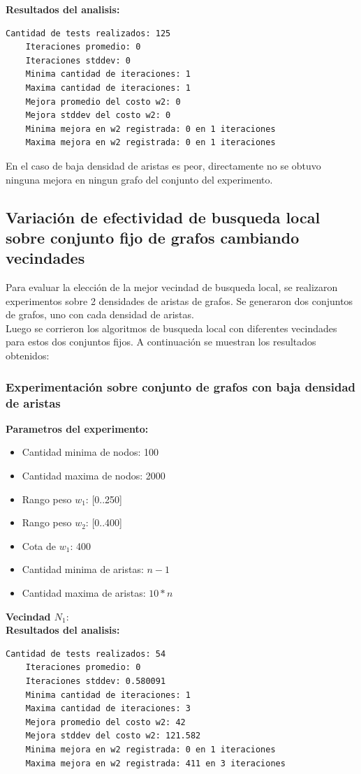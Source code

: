 \textbf{Resultados del analisis:}
\begin{lstlisting}[frame=single]
	Cantidad de tests realizados: 125
	Iteraciones promedio: 0
	Iteraciones stddev: 0
	Minima cantidad de iteraciones: 1
	Maxima cantidad de iteraciones: 1
	Mejora promedio del costo w2: 0
	Mejora stddev del costo w2: 0
	Minima mejora en w2 registrada: 0 en 1 iteraciones
	Maxima mejora en w2 registrada: 0 en 1 iteraciones
\end{lstlisting}

En el caso de baja densidad de aristas es peor, directamente no se obtuvo ninguna mejora en ningun grafo del conjunto del experimento.

\subsection{Variaci\'on de efectividad de busqueda local sobre conjunto fijo de grafos cambiando vecindades}
Para evaluar la elecci\'on de la mejor vecindad de busqueda local, se realizaron experimentos sobre 2 densidades de aristas de grafos. Se generaron dos conjuntos de grafos, uno con cada densidad de aristas.\\
Luego se corrieron los algoritmos de busqueda local con diferentes vecindades para estos dos conjuntos fijos. A continuaci\'on se muestran los resultados obtenidos:

\subsubsection{Experimentaci\'on sobre conjunto de grafos con baja densidad de aristas}

\textbf{Parametros del experimento:}
\begin{itemize}
	\item Cantidad minima de nodos: 100
	\item Cantidad maxima de nodos: 2000
	\item Rango peso $w_1$: [0..250]
	\item Rango peso $w_2$: [0..400]
	\item Cota de $w_1$: 400
	\item Cantidad minima de aristas: $n-1$
	\item Cantidad maxima de aristas: $10*n$
\end{itemize}  

\textbf{Vecindad $N_1$}:\\
\textbf{Resultados del analisis:}
\begin{lstlisting}[frame=single]
	Cantidad de tests realizados: 54
	Iteraciones promedio: 0
	Iteraciones stddev: 0.580091
	Minima cantidad de iteraciones: 1
	Maxima cantidad de iteraciones: 3
	Mejora promedio del costo w2: 42
	Mejora stddev del costo w2: 121.582
	Minima mejora en w2 registrada: 0 en 1 iteraciones
	Maxima mejora en w2 registrada: 411 en 3 iteraciones
\end{lstlisting}

